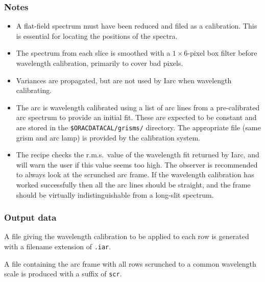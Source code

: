 \documentclass[twoside,11pt]{article}
\renewcommand{\_}{\texttt{\symbol{95}}}
\begin{document}
\subsubsection*{Notes}\begin{itemize}

\item

A flat-field spectrum must have been reduced and filed as a calibration.
This is essential for locating the positions of the spectra.

\item

The spectrum from each slice is smoothed with a $1 \times 6$-pixel box
filter before wavelength calibration, primarily to cover bad pixels.

\item

Variances are propagated, but are not used by Iarc when wavelength
calibrating.

\item

The arc is wavelength calibrated using a list of arc lines from a
pre-calibrated arc spectrum to provide an initial fit. These are
expected to be constant and are stored in the {\tt \$ORAC\_DATA\_CAL/grisms/}
directory. The appropriate file (same grism and arc lamp) is provided
by the calibration system.

\item

The recipe checks the r.m.s.\ value of the wavelength fit returned by
Iarc, and will warn the user if this value seems too high. The
observer is recommended to always look at the scrunched arc frame. If
the wavelength calibration has worked successfully then all the arc
lines should be straight, and the frame should be virtually
indistinguishable from a long-slit spectrum.


\end{itemize}

\subsubsection*{Output data}

A file giving the wavelength calibration to be applied to each row is
generated with a filename extension of {\tt .iar}.

A file containing the arc frame with all rows scrunched to a common
wavelength scale is produced with a suffix of {\tt \_scr}.
\end{document}
